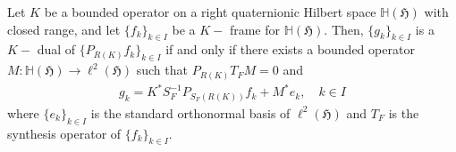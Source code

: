 \documentclass[10pt,a4paper]{amsart}
\begin{document}
	\begin{theorem}
		Let $K$ be a bounded operator on a right quaternionic Hilbert space $\mathbb{H}(\mathfrak{H})$ with closed range, and let $\{f_k\}_{k\in I}$ be a $K-$ frame for $\mathbb{H}(\mathfrak{H})$. Then, $\{g_k\}_{k \in I}$ is a $K-$ dual of $\{P_{R(K)}f_k\}_{k\in I}$ if and only if there exists a bounded operator $M: \mathbb{H}(\mathfrak{H}) \to \ell ^2(\mathfrak{H})$ such that $P_{R(K)}T_FM=0$ and
		\begin{align*}
			g_k= K^* S_F^{-1}P_{S_F(R(K))}f_k + M^*e_k, \quad k \in I
		\end{align*}
		where $\{e_k\}_{k \in I}$ is the standard orthonormal basis of $\ell ^2(\mathfrak{H})$ and $T_F$ is the synthesis operator of $\{f_k\}_{k\in I}$.
	\end{theorem}
\end{document}
